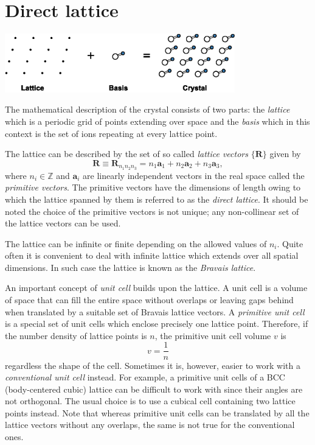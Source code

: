 \section{Direct lattice}

\vspace*{0.5cm}
\begin{center}
\includegraphics[width=0.75\textwidth]{crystal_structure/figures/crystal.eps}
\end{center}

\noindent
The mathematical description of the crystal consists of two parts: the \emph{lattice} which is a periodic grid of points extending over space and the \emph{basis} which in this context is the set of ions repeating at every lattice point.

The lattice can be described by the set of so called \emph{lattice vectors} $\lbrace\mathbf{R}\rbrace$ given by
\begin{equation}\label{eq:direct_lattice}
\mathbf{R} \equiv \mathbf{R}_{n_1 n_2 n_3}  = n_1 \mathbf{a}_1 + n_2 \mathbf{a}_2 + n_3 \mathbf{a}_3,
\end{equation}
where $n_i \in \mathds{Z}$ and $\mathbf{a}_i$ are linearly independent vectors in the real space called the \emph{primitive vectors}. The primitive vectors have the dimensions of length owing to which the lattice spanned by them is referred to as the \emph{direct lattice}. It should be noted the choice of the primitive vectors is not unique; any non-collinear set of the lattice vectors can be used.

The lattice can be infinite or finite depending on the allowed values of $n_i$. Quite often it is convenient to deal with infinite lattice which extends over all spatial dimensions. In such case the lattice is known as the \emph{Bravais lattice}. 

An important concept of \emph{unit cell} builds upon the lattice. A unit cell is a volume of space that can fill the entire space without overlaps or leaving gaps behind when translated by a suitable set of Bravais lattice vectors. A \emph{primitive unit cell} is a special set of unit cells which enclose precisely one lattice point. Therefore, if the number density of lattice points is $n$, the primitive unit cell volume $v$ is 
\begin{equation}
v = \frac{1}{n}
\end{equation}
regardless the shape of the cell. Sometimes it is, however, easier to work with a \emph{conventional unit cell} instead. For example, a primitive unit cells of a BCC (body-centered cubic) lattice can be difficult to work with since their angles are not orthogonal. The usual choice is to use a cubical cell containing two lattice points instead. Note that whereas primitive unit cells can be translated by all the lattice vectors without any overlaps, the same is not true for the conventional ones. 

